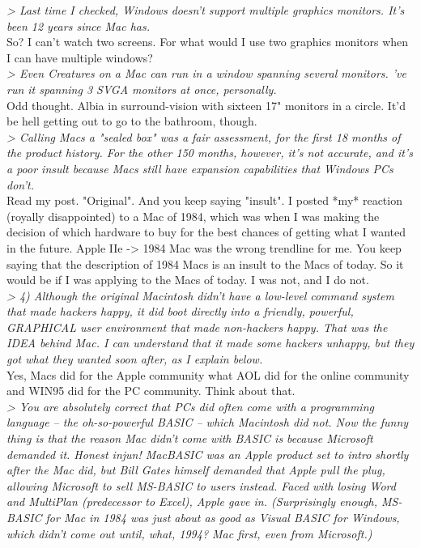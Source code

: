 \documentclass[11pt,twoside,a4paper]{article}
\begin{document}
\begin{multicols*}{2}
\emph{> Last time I checked, Windows doesn't support multiple graphics monitors. It's been 12 years since Mac has.}~\\

So?  I can't watch two screens.  For what would I use two graphics monitors when I can have multiple windows?~\\

\emph{> Even Creatures on a Mac can run in a window spanning several monitors. 've run it spanning 3 SVGA monitors at once, personally.}~\\

Odd thought.  Albia in surround-vision with sixteen 17" monitors in a circle.  It'd be hell getting out to go to the bathroom, though.~\\

\emph{> Calling Macs a "sealed box" was a fair assessment, for the first 18 months of the product history. For the other 150 months, however, it's not accurate, and it's a poor insult because Macs still have expansion capabilities that Windows PCs don't.}~\\

Read my post.  "Original".  And you keep saying "insult".  I posted *my* reaction (royally disappointed) to a Mac of 1984, which was when I was making the decision of which hardware to buy for the best chances of getting what I wanted in the future.  Apple IIe -> 1984 Mac was the wrong trendline for me.  You keep saying that the description of 1984 Macs is an insult to the Macs of today.  So it would be if I was applying to the Macs of today.  I was not, and I do not.~\\

\emph{> 4) Although the original Macintosh didn't have a low-level command system that made hackers happy, it did boot directly into a friendly, powerful, GRAPHICAL user environment that made non-hackers happy. That was the IDEA behind Mac. I can understand that it made some hackers unhappy, but they got what they wanted soon after, as I explain below.}~\\

Yes, Macs did for the Apple community what AOL did for the online community and WIN95 did for the PC community.  Think about that.~\\

\emph{> You are absolutely correct that PCs did often come with a programming language -- the oh-so-powerful BASIC -- which Macintosh did not. Now the funny thing is that the reason Mac didn't come with BASIC is because Microsoft demanded it. Honest injun! MacBASIC was an Apple product set to intro shortly after the Mac did, but Bill Gates himself demanded that Apple pull the plug, allowing Microsoft to sell MS-BASIC to users instead. Faced with losing Word and MultiPlan (predecessor to Excel), Apple gave in. (Surprisingly enough, MS-BASIC for Mac in 1984 was just about as good as Visual BASIC for Windows, which didn't come out until, what, 1994? Mac first, even from Microsoft.)}~\\


\end{multicols*}
\end{document}
